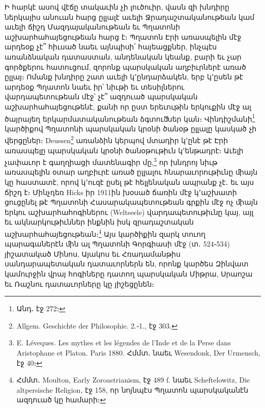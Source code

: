 \documentclass{article}
\begin{document}
{Ի հարկէ ասով վէճը տակաւին չի լուծուիր, վասն զի խնդիրը ներկայիս անուան հարց ըլլալէ աւելի Ջրադաշտականութեան կամ աւելի ճիշդ Մազդայականութեան եւ Պղատոնի աշխարհահայեցութեան հարց է։ Պղատոն Էրի առասպելին մէջ արդեօք չէ՞ հիւսած նաեւ այնպիսի՛ հայեացքներ, ինչպէս առանձնական դատաստան, անդենական կեանք, բարի եւ չար գործքերու հատուցում, զորոնք պարսկական աղբիւրներէ առած ըլլայ։ Ոմանք խնդիրը շատ աւելի կ՚ընդարձակեն, երբ կ՚ըսեն թէ արդեօք Պղատոն նաեւ իր՝ նիւթի եւ տեսիլներու վարդապետութեան մէջ՝ չէ՞ ազդուած պարսկական աշխարհահայեցութենէ, քանի որ ըստ երեւութին երկուքին մէջ ալ ծայրայեղ երկարմատականութեան ձգտուﬓեր կան։ Վինդիշմանի\footnote{Անդ․ էջ 272։} կարծիքով Պղատոնի պարսկական կրօնի ծանօթ ըլլալը կասկած չի վերցըներ։ Deussen\footnote{Allgem. Geschichte der Philosophie. 2.֊1., էջ 303.} առանձին կերպով մտադիր կ՚ընէ թէ Էրի առասպելը պարսկական կրօնի ծանօթութիւն կ՚ենթադրէ։ Աւելի չափաւոր է գաղղիացի մատենագիր մը,\footnote{E. Léveques. Les mythes et les légendes de l'Inde et de la Perse dans Aristophane et Platon. Paris 1880. Հմմտ․ նաեւ Wesendonk, Der Urmensch, էջ 40։} որ խնդրոյ նիւթ առասպելին օտար աղբիւրէ առած ըլլալու հնարաւորութիւնը ﬕայն կը հաստատէ, որով կ՚ուզէ ըսել թէ հելլենական ապրանք չէ․ եւ այս ճիշդ է։ Մինչդեռ Hicks իր 1911ին խօսած ճառին մէջ կ՚աշխատի ցուցընել թէ Պղատոնի Հասարակապետութեան գրքին մէջ ոչ ﬕայն երկու աշխարհահոգիներու (Weltseele) վարդապետութիւնը կայ, այլ եւ ակնարկութիւններ ինքնին իսկ զրադաշտական աշխարհահայեցութեան։\footnote{Հմմտ․ Moulton, Early Zoroastrianism, էջ 489 f. նաեւ Scheftelowitz, Die altpersische Religion, էջ 158, որ նոյնպէս Պղատոն պարսկականէն ազդուած կը համարի։} Այս կարծիքին զարկ տուող պարագաներէն ﬕն ալ Պղատոնի Գորգիասի մէջ (տ․ 524֊534) յիշատակած Մինոս, Այակոս եւ Հռադամանթիս սանդարապետական դատաւորներն են, որոնք կարծես Զինվատ կամուրջին վրայ հոգիները դատող պարսկական Միթրա, Սրաոշա եւ Ռաշնու դատաւորները կը յիշեցընեն։

}
\end{document}

